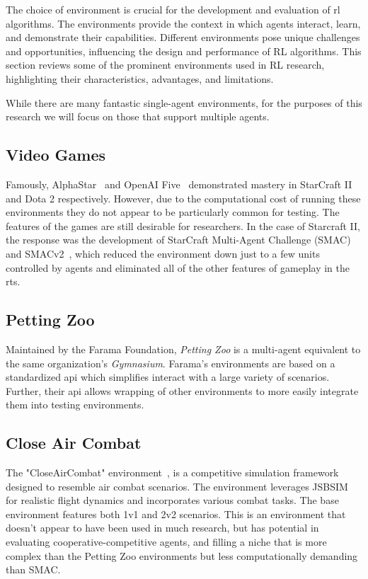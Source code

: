 The choice of environment is crucial for the development and evaluation 
of \gls{rl} algorithms. The environments provide the context in 
which agents interact, learn, and demonstrate their capabilities. 
Different environments pose unique challenges and opportunities, 
influencing the design and performance of RL algorithms. 
This section reviews some of the prominent environments used in 
RL research, highlighting their characteristics, advantages, and limitations.

While there are many fantastic single-agent environments, for the purposes 
of this research we will focus on those that support multiple agents.

    \subsection*{Video Games}

Famously, AlphaStar~\cite{vinyals2019} and OpenAI Five~\cite*{berner2019}
demonstrated mastery in StarCraft II and Dota 2 respectively.
However, due to the computational cost of running these environments
they do not appear to be particularly common for testing.
The features of the games are still desirable for researchers.
%
In the case of Starcraft II, the response was the development 
of StarCraft Multi-Agent Challenge (SMAC)~\cite{samvelyan2019} 
and SMACv2~\cite{ellis2023}, which reduced the 
environment down just to a few units controlled by agents and 
eliminated all of the other features of gameplay in the \gls{rts}.

    \subsection*{Petting Zoo}

Maintained by the Farama Foundation, \emph{Petting Zoo} is a 
multi-agent equivalent to the same organization's \emph{Gymnasium}.
Farama's environments are based on a standardized \gls{api}
which simplifies interact with a large variety of scenarios.
Further, their \gls{api} allows wrapping of other environments
to more easily integrate them into testing environments.

    \subsection*{Close Air Combat}

The "CloseAirCombat" environment~\cite{liu2022light}, is a competitive 
simulation framework designed to resemble air combat scenarios.
The environment leverages JSBSIM for realistic flight dynamics and 
incorporates various combat tasks.
The base environment features both 1v1 and 2v2 scenarios.
This is an environment that doesn't appear to have been used in much 
research, but has potential in evaluating cooperative-competitive agents,
and filling a niche that is more complex than the Petting Zoo
environments but less computationally demanding than SMAC.

